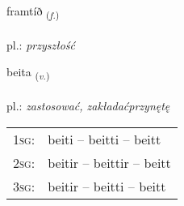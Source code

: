 \documentclass[frontgrid, backgrid]{flacards}\usepackage[]{graphicx}\usepackage[]{xcolor}
\begin{document}
\renewcommand{\blhead}{\vskip5pt {\small\bfseries\footnotesize Nafnorð | Noun }}
\renewcommand{\bcfoot}{\vskip5pt \hspace{2pt}{\small\bfseries\footnotesize 1K}}


{framtíð \small{\textsubscript{(\textit{f.})}} \\[1ex] %
\textphonetic{[framtʰið]} \\
pl.: \emph{przyszłość} \\  [2ex]
\renewcommand*{\arraystretch}{0.8}
}

\renewcommand{\flhead}{\vskip5pt \fboxsep=0pt {\small\bfseries\footnotesize Sagnorð | Verb}}
\renewcommand{\fcfoot}{\vskip5pt \fboxsep=0pt \hspace{2pt}{\small\bfseries\footnotesize 1K}}

\renewcommand{\blhead}{\vskip5pt {\small\bfseries\footnotesize Sagnorð | Verb }}
\renewcommand{\bcfoot}{\vskip5pt \hspace{2pt}{\small\bfseries\footnotesize 1K}}


{beita \small{\textsubscript{(\textit{v.})}} \\[1ex] %
\textphonetic{[peiːta]} \\
pl.: \emph{zastosować, zakładaćprzynętę} \\  [2ex]
\renewcommand*{\arraystretch}{0.8}
\begin{tabular}{p{1cm}l}
\textsc{1sg}: & beiti -- beitti -- beitt \\ 
\textsc{2sg}: & beitir -- beittir -- beitt \\ 
\textsc{3sg}: & beitir -- beitti -- beitt \\ 
\end{tabular}
}
\end{document}
